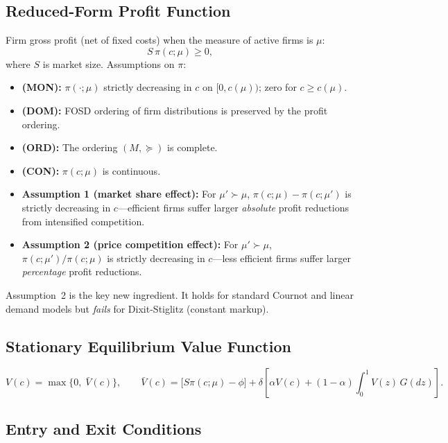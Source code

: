 \subsection*{Reduced-Form Profit Function}

Firm gross profit (net of fixed costs) when the measure of active firms is $\mu$:
\begin{equation}
  S\,\pi(c;\mu)\geq 0,
  \label{eq:an_profit}
\end{equation}
where $S$ is market size. Assumptions on $\pi$:
\begin{itemize}
  \item \textbf{(MON):} $\pi(\cdot;\mu)$ strictly decreasing in $c$ on
    $[0,c(\mu))$; zero for $c\geq c(\mu)$.
  \item \textbf{(DOM):} FOSD ordering of firm distributions is preserved by
    the profit ordering.
  \item \textbf{(ORD):} The ordering $(M,\succeq)$ is complete.
  \item \textbf{(CON):} $\pi(c;\mu)$ is continuous.
  \item \textbf{Assumption 1 (market share effect):} For $\mu'\succ\mu$,
    $\pi(c;\mu)-\pi(c;\mu')$ is strictly decreasing in $c$---efficient firms
    suffer larger \emph{absolute} profit reductions from intensified competition.
  \item \textbf{Assumption 2 (price competition effect):} For $\mu'\succ\mu$,
    $\pi(c;\mu')/\pi(c;\mu)$ is strictly decreasing in $c$---less efficient
    firms suffer larger \emph{percentage} profit reductions.
\end{itemize}

Assumption~2 is the key new ingredient. It holds for standard Cournot and
linear demand models but \emph{fails} for Dixit-Stiglitz (constant markup).

\subsection*{Stationary Equilibrium Value Function}

\begin{equation}
  V(c) = \max\bigl\{0,\;\bar{V}(c)\bigr\}, \qquad
  \bar{V}(c) = \bigl[S\pi(c;\mu)-\phi\bigr]
    + \delta\!\left[\alpha V(c)+(1-\alpha)\!\int_0^1 V(z)\,G(dz)\right].
  \label{eq:an_value}
\end{equation}

\subsection*{Entry and Exit Conditions}

